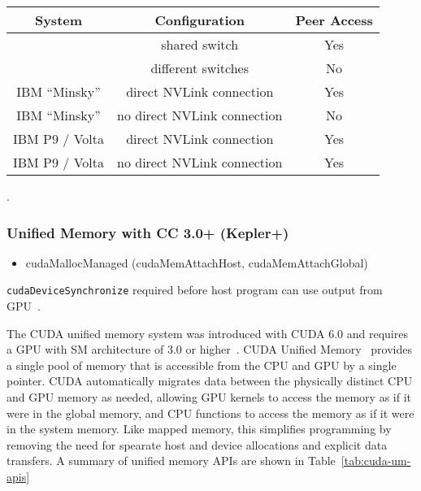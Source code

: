 \begin{table}[h]
	\centering
	\caption[]{}
	\label{tab:cuda-peer-topology}
	\begin{tabular}{|c|c|c|}
		\hline
		\textbf{System} & \textbf{Configuration} & \textbf{Peer Access} \\ \hline
		\todo{system} & shared switch  & Yes \\ \hline
		\todo{system} & different switches  & No \\ \hline
		IBM ``Minsky'' & direct NVLink connection  & Yes \\ \hline
		IBM ``Minsky'' & no direct NVLink connection  & No \\ \hline
		IBM P9 / Volta & direct NVLink connection  & Yes \\ \hline
		IBM P9 / Volta & no direct NVLink connection  & Yes \\ \hline

	\end{tabular}
\end{table}

.

\subsubsection{Unified Memory with CC 3.0+ (Kepler+)}

\begin{itemize}
	\item cudaMallocManaged (cudaMemAttachHost, cudaMemAttachGlobal)
\end{itemize}


\texttt{cudaDeviceSynchronize} required before host program can use output from GPU~\cite{nvidia2014cuda60}.

The CUDA unified memory system was introduced with CUDA 6.0 and requires a GPU with SM architecture of 3.0 or higher~\cite{nvidia2014cuda60}.
CUDA Unified Memory~\cite{harris2013cudaunifiedmemory} provides a single pool of memory that is accessible from the CPU and GPU by a single pointer.
CUDA automatically migrates data between the physically distinct CPU and GPU memory as needed, allowing GPU kernels to access the memory as if it were in the global memory, and CPU functions to access the memory as if it were in the system memory.
Like mapped memory, this simplifies programming by removing the need for spearate host and device allocations and explicit data transfers.
A summary of unified memory APIs are shown in Table~\ref{tab:cuda-um-apis}

